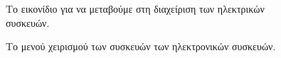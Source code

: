 \documentclass{assignment}
\begin{document}
\begin{figure}
\begin{center}
\caption{Το εικονίδιο για να μεταβούμε στη διαχείριση των ηλεκτρικών συσκευών.}
\label{fig:icon:room}
\end{center}
\end{figure}

\begin{figure}
\begin{center}
\caption{Το μενού χειρισμού των συσκευών των ηλεκτρονικών συσκευών.}
\label{fig:menu:room}
\end{center}
\end{figure}
\end{document}
